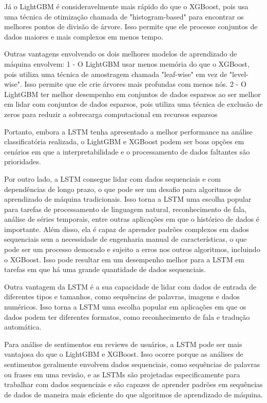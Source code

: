 Já o LightGBM é consideravelmente mais rápido do que o XGBoost, pois usa uma técnica de otimização chamada de "histogram-based" para encontrar os melhores pontos de divisão de árvore. Isso permite que ele processe conjuntos de dados maiores e mais complexos em menos tempo.

Outras vantagens envolvendo os dois melhores modelos de aprendizado de máquina envolvem: 1 - O LightGBM usar menos memória do que o XGBoost, pois utiliza uma técnica de amostragem chamada "leaf-wise" em vez de "level-wise". Isso permite que ele crie árvores mais profundas com menos nós. 2 - O LightGBM ter melhor desempenho em conjuntos de dados esparsos ao ser melhor em lidar com conjuntos de dados esparsos, pois utiliza uma técnica de exclusão de zeros para reduzir a sobrecarga computacional em recursos esparsos

Portanto, embora a LSTM tenha apresentado a melhor performance na análise classificatória realizada, o LightGBM e XGBoost podem ser boas opções em cenários em que a interpretabilidade e o processamento de dados faltantes são prioridades.

Por outro lado, a LSTM consegue lidar com dados sequenciais e com dependências de longo prazo, o que pode ser um desafio para algoritmos de aprendizado de máquina tradicionais. Isso torna a LSTM uma escolha popular para tarefas de processamento de linguagem natural, reconhecimento de fala, análise de séries temporais, entre outras aplicações em que o histórico de dados é importante. Além disso, ela é capaz de aprender padrões complexos em dados sequenciais sem a necessidade de engenharia manual de características, o que pode ser um processo demorado e sujeito a erros nos outros algoritmos, incluindo o XGBoost. Isso pode resultar em um desempenho melhor para a LSTM em tarefas em que há uma grande quantidade de dados sequenciais.

Outra vantagem da LSTM é a sua capacidade de lidar com dados de entrada de diferentes tipos e tamanhos, como sequências de palavras, imagens e dados numéricos. Isso torna a LSTM uma escolha popular em aplicações em que os dados podem ter diferentes formatos, como reconhecimento de fala e tradução automática.

Para análise de sentimentos em reviews de usuários, a LSTM pode ser mais vantajosa do que o LightGBM e XGBoost. Isso ocorre porque as análises de sentimentos geralmente envolvem dados sequenciais, como sequências de palavras ou frases em uma revisão, e as LSTMs são projetadas especificamente para trabalhar com dados sequenciais e são capazes de aprender padrões em sequências de dados de maneira mais eficiente do que algoritmos de aprendizado de máquina.

